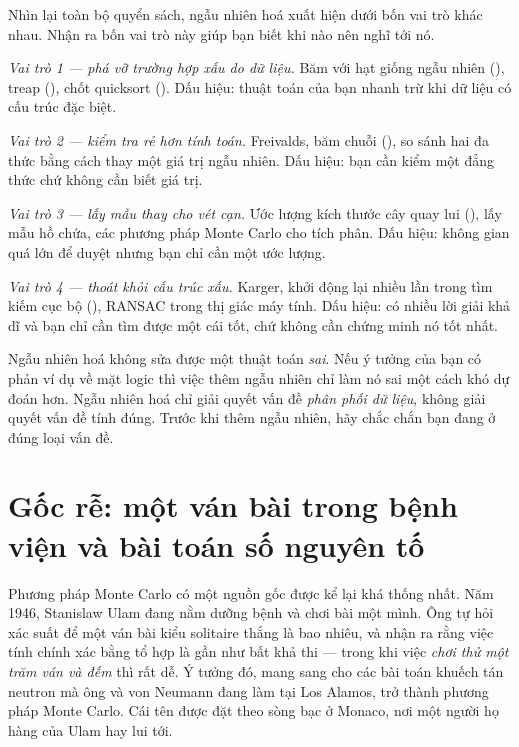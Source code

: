 \documentclass[../../algorithm.tex]{subfiles}
\begin{document}
Nhìn lại toàn bộ quyển sách, ngẫu nhiên hoá xuất hiện dưới bốn vai trò khác nhau. Nhận ra bốn vai trò này giúp bạn biết khi nào nên nghĩ tới nó.

\emph{Vai trò 1 --- phá vỡ trường hợp xấu do dữ liệu.} Băm với hạt giống ngẫu nhiên (), treap (), chốt quicksort (). Dấu hiệu: thuật toán của bạn nhanh trừ khi dữ liệu có cấu trúc đặc biệt.

\emph{Vai trò 2 --- kiểm tra rẻ hơn tính toán.} Freivalds, băm chuỗi (), so sánh hai đa thức bằng cách thay một giá trị ngẫu nhiên. Dấu hiệu: bạn cần kiểm một đẳng thức chứ không cần biết giá trị.

\emph{Vai trò 3 --- lấy mẫu thay cho vét cạn.} Ước lượng kích thước cây quay lui (), lấy mẫu hồ chứa, các phương pháp Monte Carlo cho tích phân. Dấu hiệu: không gian quá lớn để duyệt nhưng bạn chỉ cần một ước lượng.

\emph{Vai trò 4 --- thoát khỏi cấu trúc xấu.} Karger, khởi động lại nhiều lần trong tìm kiếm cục bộ (), RANSAC trong thị giác máy tính. Dấu hiệu: có nhiều lời giải khả dĩ và bạn chỉ cần tìm được một cái tốt, chứ không cần chứng minh nó tốt nhất.

\begin{cambay}
Ngẫu nhiên hoá không sửa được một thuật toán \emph{sai}. Nếu ý tưởng của bạn có phản ví dụ về mặt logic thì việc thêm ngẫu nhiên chỉ làm nó sai một cách khó dự đoán hơn. Ngẫu nhiên hoá chỉ giải quyết vấn đề \emph{phân phối dữ liệu}, không giải quyết vấn đề tính đúng. Trước khi thêm ngẫu nhiên, hãy chắc chắn bạn đang ở đúng loại vấn đề.
\end{cambay}

\section{Gốc rễ: một ván bài trong bệnh viện và bài toán số nguyên tố}

Phương pháp Monte Carlo có một nguồn gốc được kể lại khá thống nhất. Năm 1946, Stanislaw Ulam đang nằm dưỡng bệnh và chơi bài một mình. Ông tự hỏi xác suất để một ván bài kiểu solitaire thắng là bao nhiêu, và nhận ra rằng việc tính chính xác bằng tổ hợp là gần như bất khả thi --- trong khi việc \emph{chơi thử một trăm ván và đếm} thì rất dễ. Ý tưởng đó, mang sang cho các bài toán khuếch tán neutron mà ông và von Neumann đang làm tại Los Alamos, trở thành phương pháp Monte Carlo. Cái tên được đặt theo sòng bạc ở Monaco, nơi một người họ hàng của Ulam hay lui tới.
\end{document}
